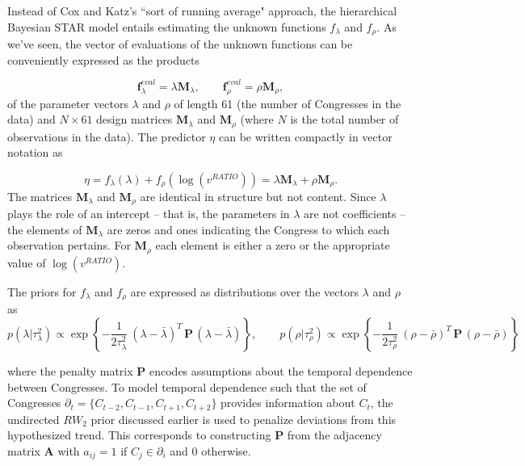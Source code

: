 Instead of Cox and Katz's ``sort of running average" approach, the hierarchical Bayesian STAR model entails estimating the unknown functions $f_\lambda$ and $f_\rho$. As we've seen, the vector of evaluations of the unknown functions can be conveniently expressed as the products 

{\singlespacing
$$
\mathbf{f}^{eval}_\lambda = \lambda \mathbf{M}_\lambda, 
\qquad 
\mathbf{f}^{eval}_\rho = \rho \mathbf{M}_\rho, 
$$
}
%
\noindent of the parameter vectors $\lambda$ and $\rho$ of length 61 (the number of Congresses in the data) and  $N \times 61$ design matrices  $\mathbf{M}_\lambda$ and  $\mathbf{M}_\rho$ (where $N$ is the total number of observations in the data). The predictor $\eta$ can be written compactly in vector notation as 

{\singlespacing
$$ \eta = f_\lambda(\lambda) +  f_\rho(\log{(v^{RATIO})}) = \lambda \mathbf{M}_\lambda + \rho \mathbf{M}_\rho.$$
}
%
\indent The matrices $\mathbf{M}_\lambda$ and $\mathbf{M}_\rho$ are identical in structure but not content. Since $\lambda$ plays the role of an intercept -- that is, the parameters in $\lambda$ are not coefficients -- the elements of $\mathbf{M}_\lambda$ are zeros and ones indicating the Congress to which each observation pertains. For $\mathbf{M}_\rho$ each element is either a zero or the appropriate value of $\log{(v^{RATIO})}$. 


The priors for $f_{\lambda}$ and $f_{\rho}$ are expressed as distributions over the vectors $\lambda$ and $\rho$ as 
%
$$ 
p(\lambda | \tau_\lambda^2) \propto \exp{\left\{-\frac{1}{2\tau_\lambda^2} \: (\lambda - \bar{\lambda})^T \, \mathbf{P}  \, (\lambda - \bar{\lambda}) \right\}}, 
\qquad
p(\rho | \tau_\rho^2) \propto \exp{\left\{-\frac{1}{2\tau_\rho^2} \: (\rho - \bar{\rho})^T \, \mathbf{P} \, (\rho-\bar{\rho}) \right\}}
 $$

%
\noindent where the penalty matrix $\mathbf{P}$ encodes assumptions about the temporal dependence between Congresses. %
To model temporal dependence such that the set of Congresses $\partial_t = \{C_{t-2}, C_{t-1}, C_{t+1}, C_{t + 2} \}$ provides information about $C_t$, the undirected $RW_2$ prior discussed earlier is used to penalize deviations from this hypothesized trend. This corresponds to constructing $\mathbf{P}$ from the adjacency matrix $\mathbf{A}$ with $a_{ij} = 1$ if $C_j \in \partial_i$ and 0 otherwise.

